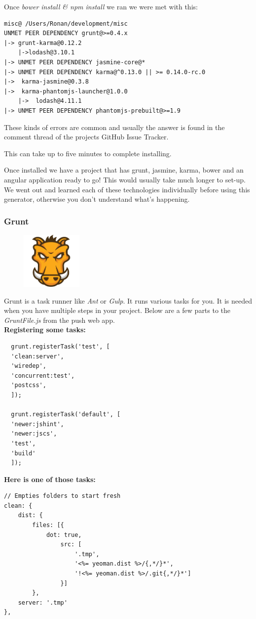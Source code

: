 Once \textit{bower install \& npm install} we ran we were met with this:
\begin{verbatim}
misc@ /Users/Ronan/development/misc
UNMET PEER DEPENDENCY grunt@>=0.4.x
|-> grunt-karma@0.12.2
    |->lodash@3.10.1
|-> UNMET PEER DEPENDENCY jasmine-core@*
|-> UNMET PEER DEPENDENCY karma@^0.13.0 || >= 0.14.0-rc.0
|->  karma-jasmine@0.3.8
|->  karma-phantomjs-launcher@1.0.0
    |->  lodash@4.11.1
|-> UNMET PEER DEPENDENCY phantomjs-prebuilt@>=1.9
 \end{verbatim}
These kinds of errors are common and usually the answer is found in the comment thread of the projects GitHub Issue Tracker.

This can take up to five minutes to complete installing.

Once installed we have a project that has grunt, jasmine, karma, bower and an angular application ready to go!
This would usually take much longer to set-up.
We went out and learned each of these technologies individually before using this generator, otherwise you don't understand what's happening.

\subsubsection{Grunt}
\begin{figure}
\includegraphics[width=3cm]{img/mobile-app/logos/grunt.png}
\end{figure} 
Grunt \cite{grunt} is a task runner like \textit{Ant} or \textit{Gulp}.
It runs various tasks for you.
It is needed when you have multiple steps in your project.
Below are a few parts to the \textit{GruntFile.js} from the push web app.
\\

\textbf{Registering some tasks:}
\begin{verbatim}
  grunt.registerTask('test', [
  'clean:server',
  'wiredep',
  'concurrent:test',
  'postcss',
  ]);
  
  grunt.registerTask('default', [
  'newer:jshint',
  'newer:jscs',
  'test',
  'build'
  ]);
\end{verbatim}
  
\textbf{Here is one of those tasks:}
  \begin{verbatim}
// Empties folders to start fresh
clean: {
    dist: {
        files: [{
            dot: true,
                src: [
                    '.tmp',
                    '<%= yeoman.dist %>/{,*/}*',
                    '!<%= yeoman.dist %>/.git{,*/}*']
                }]
        },
    server: '.tmp'
},
  \end{verbatim}
  
